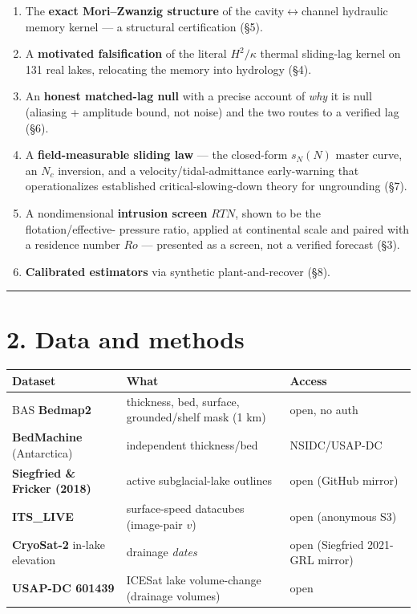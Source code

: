 \documentclass[11pt]{article}
\begin{document}
\begin{enumerate}
\item The \textbf{exact Mori–Zwanzig structure} of the cavity\ensuremath{\leftrightarrow}channel hydraulic memory kernel — a structural certification (§5).
\item A \textbf{motivated falsification} of the literal $H^{2}/\kappa $ thermal sliding-lag kernel on 131 real lakes, relocating the memory into hydrology (§4).
\item An \textbf{honest matched-lag null} with a precise account of \emph{why} it is null (aliasing + amplitude bound, not noise) and the two routes to a verified lag (§6).
\item A \textbf{field-measurable sliding law} — the closed-form $s_{N}(N)$ master curve, an $N_{c}$ inversion, and a velocity/tidal-admittance early-warning that operationalizes established critical-slowing-down theory for ungrounding (§7).
\item A nondimensional \textbf{intrusion screen} $RTN$, shown to be the flotation/effective- pressure ratio, applied at continental scale and paired with a residence number $Ro$ — presented as a screen, not a verified forecast (§3).
\item \textbf{Calibrated estimators} via synthetic plant-and-recover (§8).
\end{enumerate}


\medskip\hrule\medskip


\section*{2. Data and methods}


\begin{center}\small
\begin{tabularx}{\linewidth}{>{\raggedright\arraybackslash}X>{\raggedright\arraybackslash}X>{\raggedright\arraybackslash}X}
\toprule
Dataset & What & Access \\
\midrule
BAS \textbf{Bedmap2} & thickness, bed, surface, grounded/shelf mask (1 km) & open, no auth \\
\textbf{BedMachine} (Antarctica) & independent thickness/bed & NSIDC/USAP-DC \\
\textbf{Siegfried \& Fricker (2018)} & 131 active subglacial-lake outlines & open (GitHub mirror) \\
\textbf{ITS\_LIVE} & surface-speed datacubes (image-pair $v$) & open (anonymous S3) \\
\textbf{CryoSat-2} in-lake elevation & drainage \emph{dates} & open (Siegfried 2021-GRL mirror) \\
\textbf{USAP-DC 601439} & ICESat lake volume-change (drainage volumes) & open \\
\bottomrule
\end{tabularx}
\end{center}
\end{document}
